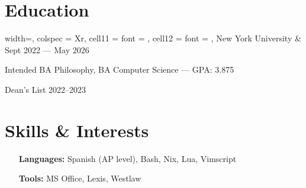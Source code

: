 \documentclass{article}
\begin{document}
\section{Education}
\titlerule

\vspace{0.5em}

\begin{tblr}{
    width=\textwidth,
    colspec = {Xr},
    cell{1}{1} = {font = {\bfseries}},
    cell{1}{2} = {font = {\itshape}},
  }
  New York University & Sept 2022 --- May 2026 \\
\end{tblr}
\begin{compactitem}
  \item
    Intended BA Philosophy, BA Computer Science --- GPA: 3.875
  \item
    Dean's List 2022--2023
\end{compactitem}

\vspace{0.5em}

\section{Skills \& Interests}
\titlerule

\vspace{0.5em}

\begin{itemize}
  \item[\bfseries Languages:]
    Spanish (AP level), Bash, Nix, Lua, Vimscript

  \item[\bfseries Tools:]
    MS Office, Lexis, Westlaw
\end{itemize}
\end{document}
